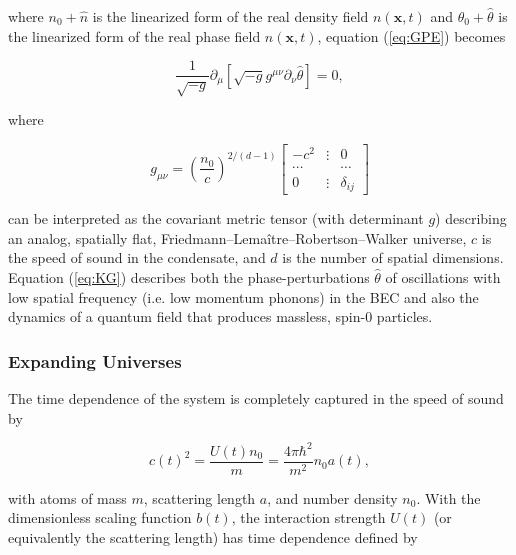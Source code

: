 \documentclass{article}
\begin{document}
            where $n_0 + \hat{n}$ is the linearized form of the real density field $n(\mathbf{x}, t)$ and $\theta_0 + \hat{\theta}$ is the linearized form of the real phase field $n(\mathbf{x}, t)$, equation (\ref{eq:GPE}) becomes\cite{Jain} 

            \begin{equation} \label{eq:KG}
                \frac{1}{\sqrt{-g}} \partial_\mu \left[ \sqrt{-g} g^{\mu \nu} \partial_\nu \hat{\theta} \right] = 0,
            \end{equation}

            where 

            \begin{equation} \label{eq:metric}
                g_{\mu \nu} = \left( \frac{n_0}{c} \right)^{2 / (d - 1)} \begin{bmatrix}
                    -c^2 & \vdots & 0 \\
                    \cdots & & \cdots \\
                    0 & \vdots & \delta_{ij}
                \end{bmatrix}
            \end{equation}

            can be interpreted as the covariant metric tensor (with determinant $g$) describing an analog, spatially flat, Friedmann–Lema{\^i}tre–Robertson–Walker universe, $c$ is the speed of sound in the condensate, and $d$ is the number of spatial dimensions.  Equation (\ref{eq:KG}) describes both the phase-perturbations $\hat{\theta}$ of oscillations with low spatial frequency (i.e. low momentum phonons) in the BEC and also the dynamics of a quantum field that produces massless, spin-0 particles.

\pagebreak

        \subsubsection{Expanding Universes}

            The time dependence of the system is completely captured in the speed of sound by 

            \begin{equation} \label{eq:speed}
                c(t)^2 = \frac{U(t) n_0}{m} = \frac{4 \pi \hbar^2}{m^2} n_0 a(t),
            \end{equation}

            with atoms of mass $m$, scattering length $a$, and number density $n_0$.  With the dimensionless scaling function $b(t)$, the interaction strength $U(t)$ (or equivalently the scattering length) has time dependence defined by 
\end{document}
